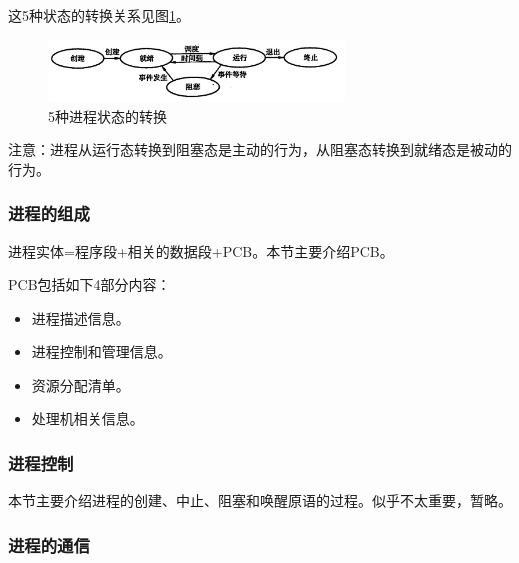 \documentclass[12pt, a4paper, oneside]{ctexart}
\begin{document}
这5种状态的转换关系见图\ref{process_state_transition}。

\begin{figure}
  \centering
  \includegraphics[width=0.7\textwidth]{./images/process_state_transition.png}
  \caption{5种进程状态的转换}
  \label{process_state_transition}
\end{figure}

注意：进程从运行态转换到阻塞态是主动的行为，从阻塞态转换到就绪态是被动的行为。

\subsubsection{进程的组成}

进程实体=程序段+相关的数据段+PCB。本节主要介绍PCB。

PCB包括如下4部分内容：
\begin{itemize}
  \item 进程描述信息。
  \item 进程控制和管理信息。
  \item 资源分配清单。
  \item 处理机相关信息。
\end{itemize}

\subsubsection{进程控制}

本节主要介绍进程的创建、中止、阻塞和唤醒原语的过程。似乎不太重要，暂略。

\subsubsection{进程的通信}
\end{document}
